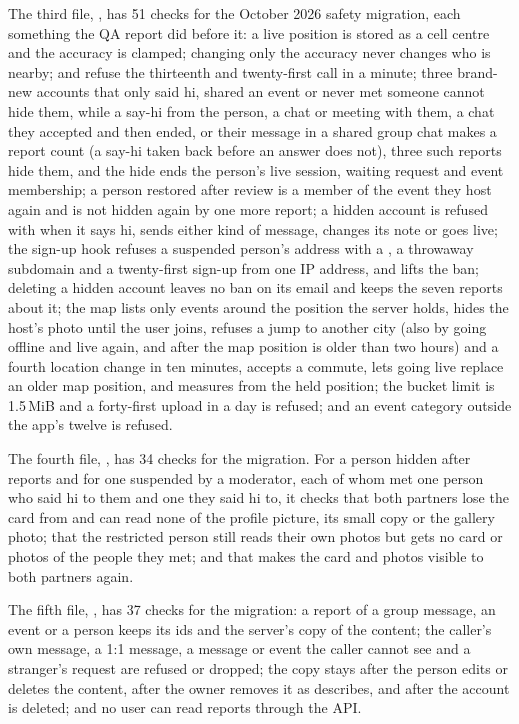 The third file, , has 51 checks for the October 2026 safety
migration, each something the QA report did before it: a live position is stored as a cell centre and the
accuracy is clamped; changing only the accuracy never changes who is nearby;  and
 refuse the thirteenth and twenty-first call in a minute; three brand-new accounts that
only said hi, shared an event or never met someone cannot hide them, while a say-hi from the person, a
chat or meeting with them, a chat they accepted and then ended, or their message in a shared group chat
makes a report count (a say-hi taken back before an answer does not), three such reports hide them, and
the hide ends the person's live session, waiting request and event membership;
a person restored after review is a member of the event they host again and is not hidden again by one
more report; a hidden account is refused with 
when it says hi, sends either kind of message, changes its note or goes live; the sign-up hook refuses a
suspended person's address with a , a throwaway subdomain and a twenty-first sign-up from one
IP address, and  lifts the ban; deleting a hidden account leaves no ban on its email and
keeps the seven reports about it; the map lists only events around the position the server holds, hides the host's
photo until the user joins, refuses a jump to another city (also by going offline and live again, and
after the map position is older than two hours) and a fourth location change in ten minutes, accepts a
commute, lets going live replace an older map position, and  measures from the held
position; the bucket limit is 1.5\,MiB and a forty-first
upload in a day is refused; and an event category outside the app's twelve is refused.

The fourth file, , has 34 checks for the
 migration. For a person hidden after reports and for one suspended by a
moderator, each of whom met one person who said hi to them and one they said hi to, it checks that both
partners lose the card from  and can read none of the profile picture, its small copy
or the gallery photo; that the restricted person still reads their own photos but gets no card or photos
of the people they met; and that  makes the card and photos visible to both partners again.

The fifth file, , has 37 checks for the
 migration: a report of a group message, an event or a person keeps its ids and the
server's copy of the content; the caller's own message, a 1:1 message, a message or event the caller
cannot see and a stranger's request are refused or dropped; the copy stays after the person edits or deletes the content, after the owner removes
it as  describes, and after the account is deleted; and no user can read
reports through the API.

